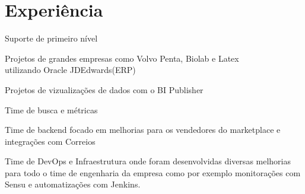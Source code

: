 \documentclass[]{deedy-resume-openfont}
\begin{document}
\begin{minipage}[t]{0.66\textwidth} 


\section{Experiência}

\vspace{\topsep} %
\begin{tightemize}
\item Suporte de primeiro nível
\end{tightemize}
\sectionsep

\begin{tightemize}
\item Projetos de grandes empresas como Volvo Penta, Biolab e Latex \\
utilizando Oracle JDEdwards(ERP)
\item Projetos de vizualizações de dados com o BI Publisher
\end{tightemize}
\sectionsep

\begin{tightemize}
\item Time de busca e métricas
\item Time de backend focado em melhorias para os vendedores do marketplace e integrações com Correios
\item Time de DevOps e Infraestrutura onde foram desenvolvidas diversas melhorias para todo o time de engenharia da empresa como por exemplo monitorações com Sensu e automatizações com Jenkins.
\end{tightemize}
\sectionsep

\descript{}
\sectionsep


\end{minipage}
\end{document}
